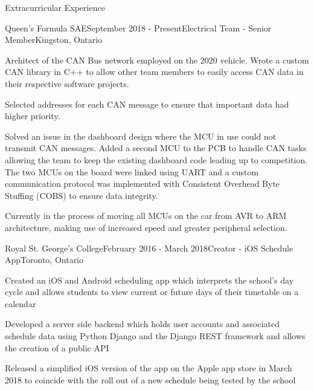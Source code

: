 \documentclass{resume} %
\begin{document}

\begin{rSection}{Extracurricular Experience}

\begin{rSubsection}{Queen's Formula SAE}{September 2018 - Present}{Electrical
    Team - Senior Member}{Kingston, Ontario}
\item Architect of the CAN Bus network employed on the 2020 vehicle. Wrote a
  custom CAN library in C++ to allow other team members to easily access CAN
  data in their respective software projects.
\item Selected addresses for each CAN message to ensure that important data had
  higher priority.
\item Solved an issue in the dashboard design where the MCU in use could not
  transmit CAN messages. Added a second MCU to the PCB to handle CAN tasks
  allowing the team to keep the existing dashboard code leading up to
  competition. The two MCUs on the board were linked using UART and a custom
  communication protocol was implemented with Consistent Overhead Byte Stuffing
  (COBS) to ensure data integrity.
\item Currently in the process of moving all MCUs on the car from AVR to ARM
  architecture, making use of increased speed and greater peripheral selection.

\end{rSubsection}

\begin{rSubsection}{Royal St. George's College}{February 2016 - March
    2018}{Creator - iOS Schedule App}{Toronto, Ontario}
\item Created an iOS and Android scheduling app which interprets the school’s day cycle and
  allows students to view current or future days of their timetable on a calendar
\item Developed a server side backend which holds user accounts and associated schedule data
  using Python Django and the Django REST framework and allows the creation of a public
  API
\item Released a simplified iOS version of the app on the Apple app store in March 2018 to
  coincide with the roll out of a new schedule being tested by the school


\end{rSubsection}
\end{rSection}
\end{document}
